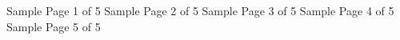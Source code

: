 \documentclass[a4paper]{article}
\begin{document}
\centering
\Huge
\null\vfil
Sample Page 1 of 5
\vfil\break
\null\vfil
Sample Page 2 of 5
\vfil\break
\null\vfil
Sample Page 3 of 5
\vfil\break
\null\vfil
Sample Page 4 of 5
\vfil\break
\null\vfil
Sample Page 5 of 5
\vfil
\end{document}
